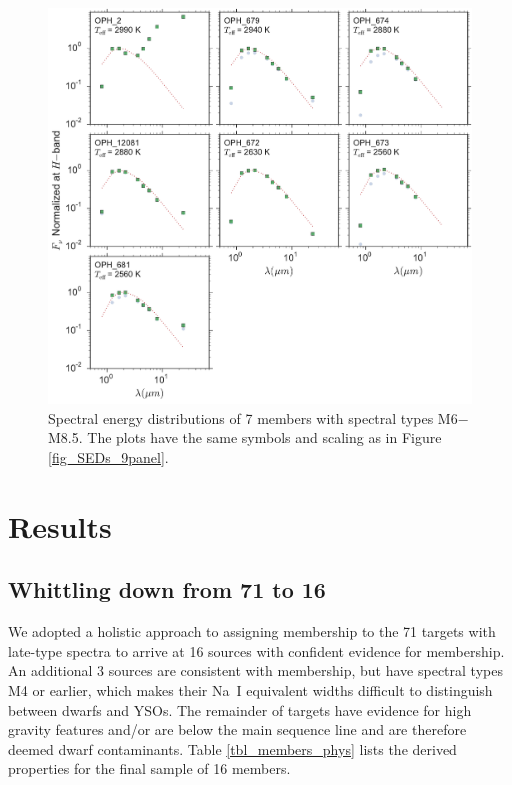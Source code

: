 \begin{figure}[ht!]
  \caption[Spectral energy distributions of seven members of \emph{Ophiuchus}]{Spectral energy distributions of 7 members with spectral types M6$-$M8.5.  The plots have the same symbols and scaling as in Figure \ref{fig_SEDs_9panel}.  \label{fig_SEDs_7panel} }
\centering
\includegraphics[scale=0.5]{chIMACS/figures/SEDS_7panel}
\end{figure}

\section{Results}
\subsection{Whittling down from 71 to 16}
We adopted a holistic approach to assigning membership to the 71 targets with late-type spectra to arrive at 16 sources with confident evidence for membership.  An additional 3 sources are consistent with membership, but have spectral types M4 or earlier, which makes their Na~I equivalent widths difficult to distinguish between dwarfs and YSOs.  The remainder of targets have evidence for high gravity features and/or are below the main sequence line and are therefore deemed dwarf contaminants.  Table \ref{tbl_members_phys} lists the derived properties for the final sample of 16 members.  

